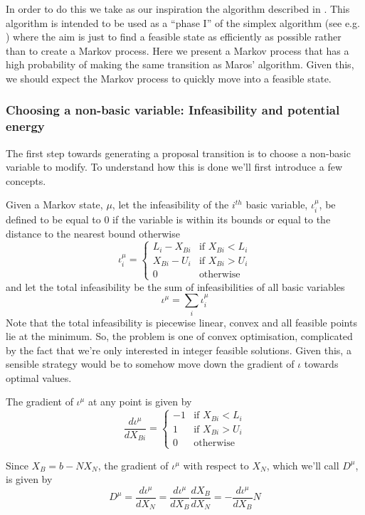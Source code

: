 \documentclass{article}
\begin{document}
In order to do this we take as our inspiration the algorithm described in \cite{maros1986general}. This algorithm is intended to be used as a ``phase I'' of the simplex algorithm (see e.g. \cite{vanderbei2015linear}) where the aim is just to find a feasible state as efficiently as possible rather than to create a Markov process. Here we present a Markov process that has a high probability of making the same transition as Maros' algorithm. Given this, we should expect the Markov process to quickly move into a feasible state.

\subsubsection{Choosing a non-basic variable: Infeasibility and potential energy}

The first step towards generating a proposal transition is to choose a non-basic variable to modify. To understand how this is done we'll first introduce a few concepts.

Given a Markov state, $\mu$, let the infeasibility of the $i^{th}$ basic variable, $\iota^\mu_i$, be defined to be equal to 0 if the variable is within its bounds or equal to the distance to the nearest bound otherwise
\[
\iota^\mu_i =
\begin{cases}
L_i-X_{Bi} & \text{if }X_{Bi}<L_i\\
X_{Bi}-U_i & \text{if }X_{Bi}>U_i\\
0 & \text{otherwise}
\end{cases}
\]
and let the total infeasibility be the sum of infeasibilities of all basic variables
\[
\iota^\mu = \sum_i \iota^\mu_i
\]
Note that the total infeasibility is piecewise linear, convex and all feasible points lie at the minimum. So, the problem is one of convex optimisation, complicated by the fact that we're only interested in integer feasible solutions. Given this,  a sensible strategy would be to somehow move down the gradient of $\iota$ towards optimal values.

The gradient of $\iota^\mu$ at any point is given by
\[
\frac{d\iota^\mu}{dX_{Bi}} = 
\begin{cases}
-1 & \text{if }X_{Bi}<L_i\\
1 & \text{if }X_{Bi}>U_i\\
0 & \text{otherwise}
\end{cases}
\]

Since $X_B = b - NX_N$, the gradient of $\iota^\mu$ with respect to $X_N$, which we'll call $D^\mu$, is given by
\[
D^\mu = \frac{d\iota^\mu}{dX_N} = \frac{d\iota^\mu}{dX_B}\frac{dX_B}{dX_N} = - \frac{d\iota^\mu}{dX_B}N
\]
\end{document}
